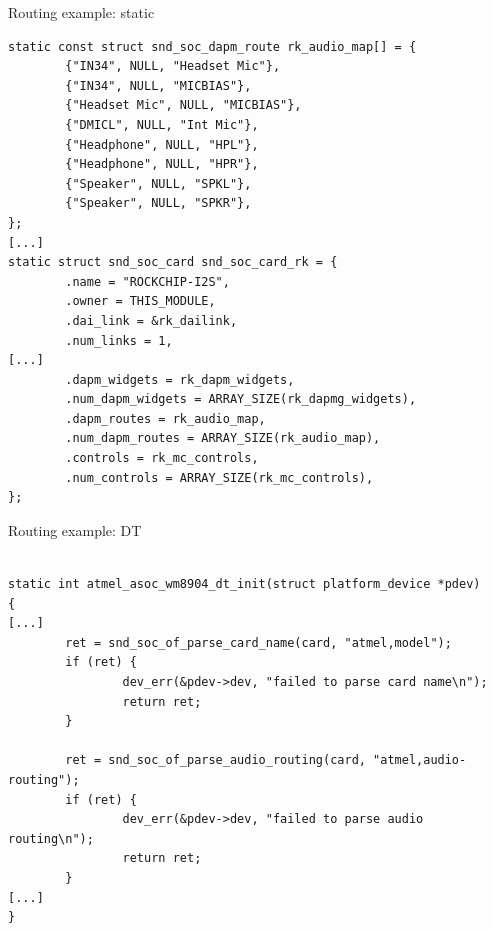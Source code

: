 \begin{frame}[fragile]{Routing example: static}
  \begin{block}{}
    \fontsize{8}{8}\selectfont
    \begin{verbatim}
static const struct snd_soc_dapm_route rk_audio_map[] = {
        {"IN34", NULL, "Headset Mic"},
        {"IN34", NULL, "MICBIAS"},
        {"Headset Mic", NULL, "MICBIAS"},
        {"DMICL", NULL, "Int Mic"},
        {"Headphone", NULL, "HPL"},
        {"Headphone", NULL, "HPR"},
        {"Speaker", NULL, "SPKL"},
        {"Speaker", NULL, "SPKR"},
};
[...]
static struct snd_soc_card snd_soc_card_rk = {
        .name = "ROCKCHIP-I2S",
        .owner = THIS_MODULE,
        .dai_link = &rk_dailink,
        .num_links = 1,
[...]
        .dapm_widgets = rk_dapm_widgets,
        .num_dapm_widgets = ARRAY_SIZE(rk_dapmg_widgets),
        .dapm_routes = rk_audio_map,
        .num_dapm_routes = ARRAY_SIZE(rk_audio_map),
        .controls = rk_mc_controls,
        .num_controls = ARRAY_SIZE(rk_mc_controls),
};
    \end{verbatim}
  \end{block}
\end{frame}

\begin{frame}[fragile]{Routing example: DT}
  \begin{block}{}
    \fontsize{10}{10}\selectfont
    \begin{verbatim}

static int atmel_asoc_wm8904_dt_init(struct platform_device *pdev)
{
[...]
        ret = snd_soc_of_parse_card_name(card, "atmel,model");
        if (ret) {
                dev_err(&pdev->dev, "failed to parse card name\n");
                return ret;
        }

        ret = snd_soc_of_parse_audio_routing(card, "atmel,audio-routing");
        if (ret) {
                dev_err(&pdev->dev, "failed to parse audio routing\n");
                return ret;
        }
[...]
}
    \end{verbatim}
  \end{block}
\end{frame}

